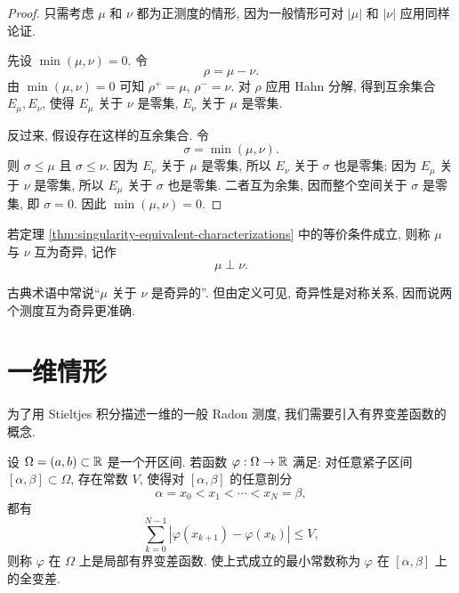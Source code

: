 \begin{proof}
	只需考虑 \(\mu\) 和 \(\nu\) 都为正测度的情形, 因为一般情形可对 \(|\mu|\) 和 \(|\nu|\) 应用同样论证.
	
	先设 \(\min(\mu,\nu)=0\). 令
	\[
	\rho=\mu-\nu.
	\]
	由 \(\min(\mu,\nu)=0\) 可知 \(\rho^+=\mu\), \(\rho^-=\nu\). 对 \(\rho\) 应用 Hahn 分解, 得到互余集合 \(E_\mu,E_\nu\), 使得 \(E_\mu\) 关于 \(\nu\) 是零集, \(E_\nu\) 关于 \(\mu\) 是零集.
	
	反过来, 假设存在这样的互余集合. 令
	\[
	\sigma=\min(\mu,\nu).
	\]
	则 \(\sigma\leq\mu\) 且 \(\sigma\leq\nu\). 因为 \(E_\nu\) 关于 \(\mu\) 是零集, 所以 \(E_\nu\) 关于 \(\sigma\) 也是零集; 因为 \(E_\mu\) 关于 \(\nu\) 是零集, 所以 \(E_\mu\) 关于 \(\sigma\) 也是零集. 二者互为余集, 因而整个空间关于 \(\sigma\) 是零集, 即 \(\sigma=0\). 因此 \(\min(\mu,\nu)=0\).
\end{proof}

\begin{defn}[互为奇异]
	\label{def:mutually-singular-measures}
	若定理 \ref{thm:singularity-equivalent-characterizations} 中的等价条件成立, 则称 \(\mu\) 与 \(\nu\) 互为奇异, 记作
	\[
	\mu\perp\nu.
	\]
\end{defn}

\begin{rem}
	古典术语中常说``\(\mu\) 关于 \(\nu\) 是奇异的''. 但由定义可见, 奇异性是对称关系, 因而说两个测度互为奇异更准确.
\end{rem}

\clearpage

\section{一维情形}
\label{sec:one-dimensional-general-radon-measures}

为了用 Stieltjes 积分描述一维的一般 Radon 测度, 我们需要引入有界变差函数的概念.

\begin{defn}[局部有界变差函数]
	\label{def:locally-bounded-variation-function}
	设 \(\Omega=(a,b)\subset\mathbb{R}\) 是一个开区间. 若函数 \(\varphi:\Omega\to\mathbb{R}\) 满足: 对任意紧子区间 \([\alpha,\beta]\subset\Omega\), 存在常数 \(V\), 使得对 \([\alpha,\beta]\) 的任意剖分
	\[
	\alpha=x_0<x_1<\cdots<x_N=\beta,
	\]
	都有
	\[
	\sum_{k=0}^{N-1}\left|\varphi(x_{k+1})-\varphi(x_k)\right|\leq V,
	\]
	则称 \(\varphi\) 在 \(\Omega\) 上是局部有界变差函数. 使上式成立的最小常数称为 \(\varphi\) 在 \([\alpha,\beta]\) 上的全变差.
\end{defn}

